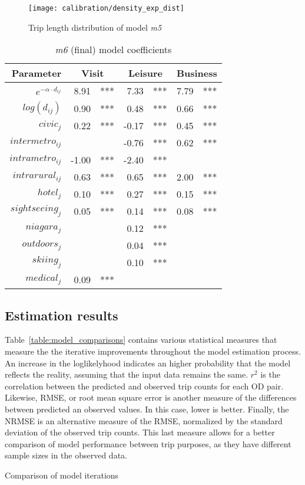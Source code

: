 \begin{figure}[H]
\centering
\texttt{[image: calibration/density\_exp\_dist]}
\caption{Trip length distribution of model \textit{m5}}
\label{fig:trip_length_m5}
\end{figure}

\begin{table}[H]
\centering
\caption{\textit{m6} (final) model coefficients}
\label{table:m6-coeff}
\begin{tabular}{@{}rrlrlrl@{}}
  \toprule
 Parameter & \multicolumn{2}{c}{Visit} & \multicolumn{2}{c}{Leisure} & \multicolumn{2}{c}{Business} \\ \midrule
  $e^{-\alpha \cdot d_{ij}}$& 8.91 & *** & 7.33 & *** & 7.79 & *** \\
  $log(d_{ij})$ & 0.90 & *** & 0.48 & *** & 0.66 & *** \\ 
  $civic_j  $ & 0.22 & *** & -0.17 & *** & 0.45 & *** \\  
  $intermetro_{ij}$  &  &  & -0.76 & *** & 0.62 & *** \\ 
  $intrametro_{ij}$  & -1.00 & *** & -2.40 & *** &  &  \\   
  $intrarural_{ij}$ & 0.63 & *** & 0.65 & *** & 2.00 & *** \\ 
  $hotel_j$  & 0.10 & *** & 0.27 & *** & 0.15 & *** \\  
  $sightseeing_j$  & 0.05 & *** & 0.14 & *** & 0.08 & *** \\ 
  $niagara_j$  &  &  & 0.12 & *** &  &  \\ 
  $outdoors_j$ &  &  & 0.04 & *** &  &  \\ 
  $skiing_j$ &  &  & 0.10 & *** &  &  \\ 
  $medical_j$   & 0.09 & *** &  &  &  &  \\ 
   \bottomrule
\end{tabular}
\end{table}


\subsection{Estimation results}
Table~\ref{table:model_comparisons} contains various statistical measures that measure the the iterative improvements throughout the model estimation process. An increase in the loglikelyhood indicates an higher probability that the model reflects the reality, assuming that the input data remains the same. $r^2$ is the correlation between the predicted and observed trip counts for each OD pair. Likewise, RMSE, or root mean square error is another measure of the differences between predicted an observed values. In this case, lower is better. Finally, the NRMSE is an alternative measure of the RMSE, normalized by the standard deviation of the observed trip counts. This last measure allows for a better comparison of model performance between trip purposes, as they have different sample sizes in the observed data. 

\begin{table}[H]
\centering
\caption{Comparison of model iterations}
\label{table:model_comparisons}
\begin{adjustbox}{center}


\end{adjustbox}

\end{table}

